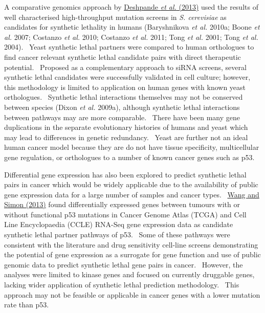 A comparative genomics approach by \hyperlink{ENREF30}{Deshpande}\hyperlink{ENREF30}{\textit{ et al.}}\hyperlink{ENREF30}{ (2013)} used the results of well characterised high-throughput mutation screens in \textit{S. cerevisiae }as candidates for synthetic lethality in humans (Baryshnikova\textit{ et al.} 2010a; Boone\textit{ et al.} 2007; Costanzo\textit{ et al.} 2010; Costanzo\textit{ et al.} 2011; Tong\textit{ et al.} 2001; Tong\textit{ et al.} 2004). \ Yeast synthetic lethal partners were compared to human orthologues to find cancer relevant synthetic lethal candidate pairs with direct therapeutic potential. \ Proposed as a complementary approach to siRNA screens, several synthetic lethal candidates were successfully validated in cell culture; however, this methodology is limited to application on human genes with known yeast orthologues. \ Synthetic lethal interactions themselves may not be conserved between species (Dixon\textit{ et al.} 2009a), although synthetic lethal interactions between pathways may are more comparable. \ There have been many gene duplications in the separate evolutionary histories of humans and yeast which may lead to differences in genetic redundancy. \ Yeast are further not an ideal human cancer model because they are do not have tissue specificity, multicellular gene regulation, or orthologues to a number of known cancer genes such as p53. \  

Differential gene expression has also been explored to predict synthetic lethal pairs in cancer which would be widely applicable due to the availability of public gene expression data for a large number of samples and cancer types. \ \hyperlink{ENREF109}{Wang and Simon (2013)} found differentially expressed genes between tumours with or without functional p53 mutations in Cancer Genome Atlas (TCGA) and Cell Line Encyclopaedia (CCLE) RNA-Seq gene expression data as candidate synthetic lethal partner pathways of p53. \ Some of these pathways were consistent with the literature and drug sensitivity cell-line screens demonstrating the potential of gene expression as a surrogate for gene function and use of public genomic data to predict synthetic lethal gene pairs in cancer. \ However, the analyses were limited to kinase genes and focused on currently druggable genes, lacking wider application of synthetic lethal prediction methodology. \ This approach may not be feasible or applicable in cancer genes with a lower mutation rate than p53. \  

